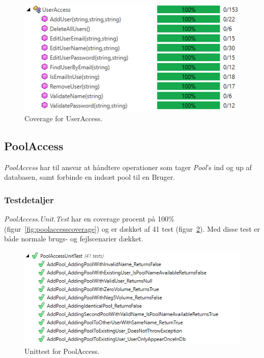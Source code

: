 \begin{figure}[H]
	\centering
	\includegraphics[width=0.7\linewidth]{figs/test/useraccesscoverage}
	\caption{Coverage for UserAccess.}
	\label{fig:useraccesscoverage}
\end{figure} 


\subsection{PoolAccess}
\textit{PoolAccess} har til ansvar at håndtere operationer som tager \textit{Pool}'s ind og up af databasen, samt forbinde en indsæt pool til en Bruger. 

\subsubsection{Testdetaljer}
\textit{PoolAccess.Unit.Test} har en coverage procent på 100\% (figur~\ref{fig:poolaccesscoverage}) og er dækket af 41 test (figur~\ref{fig:poolaccessunittest}). Med disse test er både normale brugs- og fejlscenarier dækket.

\begin{figure}[H]
	\centering
	\includegraphics[width=0.8\linewidth]{figs/test/poolaccessunittest}
	\caption{Unittest for PoolAccess.}
	\label{fig:poolaccessunittest}
\end{figure}

